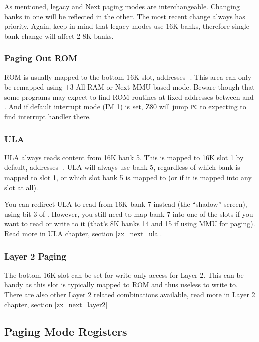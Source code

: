 As mentioned, legacy and Next paging modes are interchangeable. Changing banks in one will be reflected in the other. The most recent change always has priority. Again, keep in mind that legacy modes use 16K banks, therefore single bank change will affect 2 8K banks.


\subsubsection{Paging Out ROM}

ROM is usually mapped to the bottom 16K slot, addresses -. This area can only be remapped using +3 All-RAM or Next MMU-based mode. Beware though that some programs may expect to find ROM routines at fixed addresses between  and . And if default interrupt mode (IM 1) is set, Z80 will jump {\tt PC} to  expecting to find interrupt handler there.


\subsubsection{ULA}

ULA always reads content from 16K bank 5. This is mapped to 16K slot 1 by default, addresses -. ULA will always use bank 5, regardless of which bank is mapped to slot 1, or which slot bank 5 is mapped to (or if it is mapped into any slot at all).

You can redirect ULA to read from 16K bank 7 instead (the ``shadow'' screen), using bit 3 of . However, you still need to map bank 7 into one of the slots if you want to read or write to it (that's 8K banks 14 and 15 if using MMU for paging). Read more in ULA chapter, section \ref{zx_next_ula}.


\subsubsection{Layer 2 Paging}

The bottom 16K slot can be set for write-only access for Layer 2. This can be handy as this slot is typically mapped to ROM and thus useless to write to. There are also other Layer 2 related combinations available, read more in Layer 2 chapter, section \ref{zx_next_layer2}



\pagebreak

\subsection{Paging Mode Registers}
\label{zx_next_memorypaging_registers}

